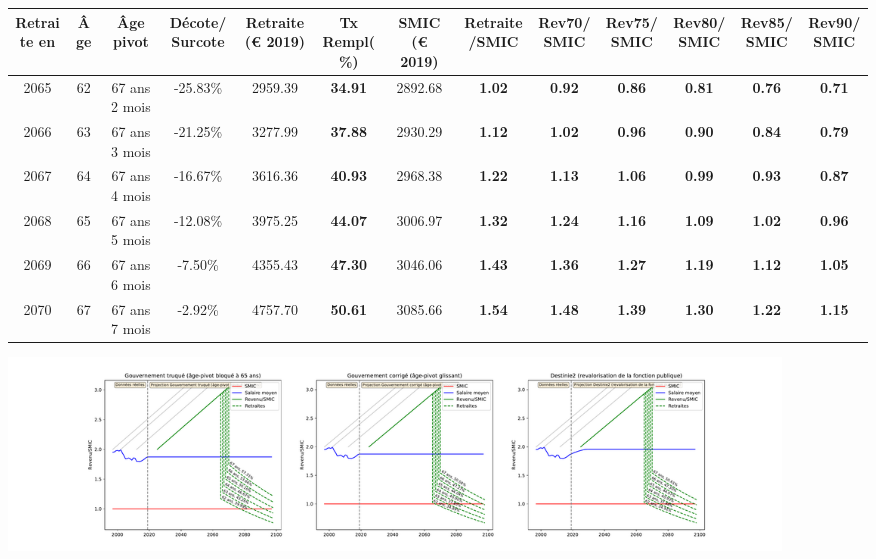 { \scriptsize \begin{center} 
\begin{tabular}[htb]{|c|c||c|c||c|c||c||c|c|c|c|c|c|} 
\hline 
 Retraite en &  Âge &  Âge pivot &  Décote/Surcote &  Retraite (\euro{} 2019) &  Tx Rempl(\%) &  SMIC (\euro{} 2019) &  Retraite/SMIC &  Rev70/SMIC &  Rev75/SMIC &  Rev80/SMIC &  Rev85/SMIC &  Rev90/SMIC \\ 
\hline \hline 
 2065 &  62 &  67 ans 2 mois &  -25.83\% &  2959.39 &  {\bf 34.91} &  2892.68 &  {\bf 1.02} &  {\bf {\color{red} 0.92}} &  {\bf {\color{red} 0.86}} &  {\bf {\color{red} 0.81}} &  {\bf {\color{red} 0.76}} &  {\bf {\color{red} 0.71}} \\ 
\hline 
 2066 &  63 &  67 ans 3 mois &  -21.25\% &  3277.99 &  {\bf 37.88} &  2930.29 &  {\bf 1.12} &  {\bf 1.02} &  {\bf {\color{red} 0.96}} &  {\bf {\color{red} 0.90}} &  {\bf {\color{red} 0.84}} &  {\bf {\color{red} 0.79}} \\ 
\hline 
 2067 &  64 &  67 ans 4 mois &  -16.67\% &  3616.36 &  {\bf 40.93} &  2968.38 &  {\bf 1.22} &  {\bf 1.13} &  {\bf 1.06} &  {\bf {\color{red} 0.99}} &  {\bf {\color{red} 0.93}} &  {\bf {\color{red} 0.87}} \\ 
\hline 
 2068 &  65 &  67 ans 5 mois &  -12.08\% &  3975.25 &  {\bf 44.07} &  3006.97 &  {\bf 1.32} &  {\bf 1.24} &  {\bf 1.16} &  {\bf 1.09} &  {\bf 1.02} &  {\bf {\color{red} 0.96}} \\ 
\hline 
 2069 &  66 &  67 ans 6 mois &  -7.50\% &  4355.43 &  {\bf 47.30} &  3046.06 &  {\bf 1.43} &  {\bf 1.36} &  {\bf 1.27} &  {\bf 1.19} &  {\bf 1.12} &  {\bf 1.05} \\ 
\hline 
 2070 &  67 &  67 ans 7 mois &  -2.92\% &  4757.70 &  {\bf 50.61} &  3085.66 &  {\bf 1.54} &  {\bf 1.48} &  {\bf 1.39} &  {\bf 1.30} &  {\bf 1.22} &  {\bf 1.15} \\ 
\hline 
\hline 
\end{tabular} 
\end{center} } 

 \begin{center}\includegraphics[width=0.9\textwidth]{fig/Ascendant23_2003_22_dest_retraite.pdf}\end{center} \label{fig/Ascendant23_2003_22_dest_retraite.pdf} 


